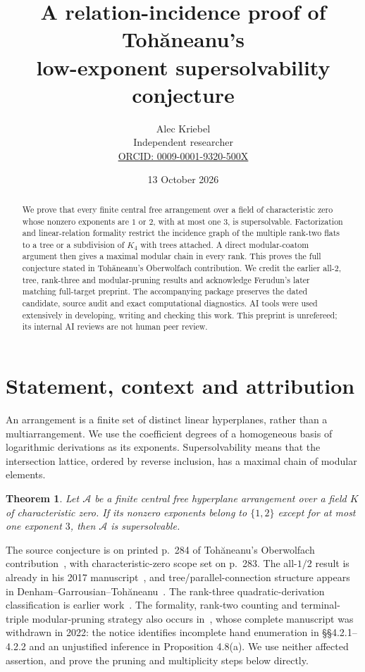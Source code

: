 \documentclass[11pt]{article}
\title{A relation-incidence proof of Toh\u{a}neanu's\protect\\ low-exponent supersolvability conjecture}
\author{Alec Kriebel\\\small Independent researcher\\\small\href{https://orcid.org/0009-0001-9320-500X}{ORCID: 0009-0001-9320-500X}}
\date{13 October 2026}
\newtheorem{theorem}{Theorem}
\begin{document}
\maketitle
\begin{abstract}
We prove that every finite central free arrangement over a field of characteristic zero whose nonzero exponents are $1$ or $2$, with at most one $3$, is supersolvable. Factorization and linear-relation formality restrict the incidence graph of the multiple rank-two flats to a tree or a subdivision of $K_4$ with trees attached. A direct modular-coatom argument then gives a maximal modular chain in every rank. This proves the full conjecture stated in Toh\u{a}neanu's Oberwolfach contribution. We credit the earlier all-$2$, tree, rank-three and modular-pruning results and acknowledge Ferudun's later matching full-target preprint. The accompanying package preserves the dated candidate, source audit and exact computational diagnostics. AI tools were used extensively in developing, writing and checking this work. This preprint is unrefereed; its internal AI reviews are not human peer review.
\end{abstract}

\section{Statement, context and attribution}
An arrangement is a finite set of distinct linear hyperplanes, rather than a multiarrangement. We use the coefficient degrees of a homogeneous basis of logarithmic derivations as its exponents. Supersolvability means that the intersection lattice, ordered by reverse inclusion, has a maximal chain of modular elements.

\begin{theorem}\label{thm:main}
Let $\mathcal A$ be a finite central free hyperplane arrangement over a field $K$ of characteristic zero. If its nonzero exponents belong to $\{1,2\}$ except for at most one exponent $3$, then $\mathcal A$ is supersolvable.
\end{theorem}

The source conjecture is on printed p.~284 of Toh\u{a}neanu's Oberwolfach contribution~\cite{owr}, with characteristic-zero scope set on p.~283. The all-$1/2$ result is already in his 2017 manuscript~\cite{low}, and tree/parallel-connection structure appears in Denham--Garrousian--Toh\u{a}neanu~\cite[Theorem 5.6]{dgt}. The rank-three quadratic-derivation classification is earlier work~\cite[Theorem 2.4]{quadratic}. The formality, rank-two counting and terminal-triple modular-pruning strategy also occurs in~\cite[Lemma 2.2, \S3, Lemma 4.2]{low}, whose complete manuscript was withdrawn in 2022: the notice identifies incomplete hand enumeration in \S\S4.2.1--4.2.2 and an unjustified inference in Proposition 4.8(a). We use neither affected assertion, and prove the pruning and multiplicity steps below directly.
\end{document}
